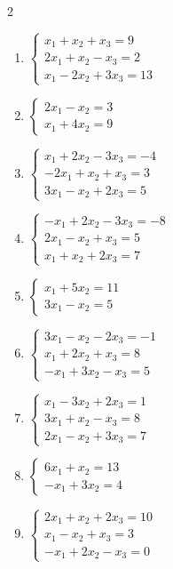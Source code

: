 \begin{multicols}{2}
\begin{enumerate}[label=\arabic*., leftmargin=*]
\item $\begin{cases}x_1+x_2+x_3=9\\2x_1+x_2-x_3=2\\x_1-2x_2+3x_3=13\end{cases}$

\item $\begin{cases}2x_1-x_2=3\\x_1+4x_2=9\end{cases}$

\item $\begin{cases}x_1+2x_2-3x_3=-4\\-2x_1+x_2+x_3=3\\3x_1-x_2+2x_3=5\end{cases}$

\item $\begin{cases}-x_1+2x_2-3x_3=-8\\2x_1-x_2+x_3=5\\x_1+x_2+2x_3=7\end{cases}$

\item $\begin{cases}x_1+5x_2=11\\3x_1-x_2=5\end{cases}$

\item $\begin{cases}3x_1-x_2-2x_3=-1\\x_1+2x_2+x_3=8\\-x_1+3x_2-x_3=5\end{cases}$

\item $\begin{cases}x_1-3x_2+2x_3=1\\3x_1+x_2-x_3=8\\2x_1-x_2+3x_3=7\end{cases}$

\item $\begin{cases}6x_1+x_2=13\\-x_1+3x_2=4\end{cases}$

\item $\begin{cases}2x_1+x_2+2x_3=10\\x_1-x_2+x_3=3\\-x_1+2x_2-x_3=0\end{cases}$


\end{enumerate}
\end{multicols}
